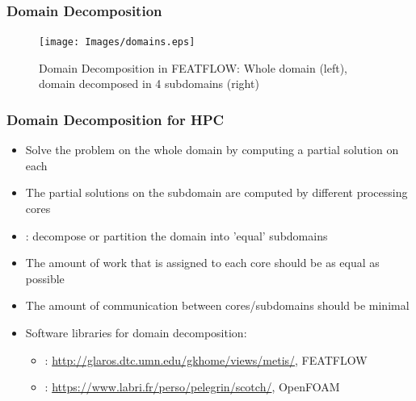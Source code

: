 \begin{frame}
\frametitle{Domain Decomposition}
\begin{figure}[h!]
\centering
\texttt{[image: Images/domains.eps]}
\caption{Domain Decomposition in FEATFLOW: Whole domain (left), domain decomposed in 4 subdomains (right)}
\label{fig:domains}
\end{figure}
\end{frame}

\begin{frame}
\frametitle{Domain Decomposition for HPC}
\begin{itemize}
\item Solve the problem on the whole domain by computing a partial solution on each 
\item The partial solutions on the subdomain are computed by different processing cores
\item {}: decompose or partition the domain into 'equal' subdomains
\item The amount of work that is assigned to each core should be as equal as possible
\item The amount of communication between cores/subdomains should be minimal
\item Software libraries for domain decomposition: 
\begin{itemize}
\item {}: \url{http://glaros.dtc.umn.edu/gkhome/views/metis/}, FEATFLOW
\item {}: \url{https://www.labri.fr/perso/pelegrin/scotch/}, OpenFOAM
\end{itemize}
\end{itemize}
\end{frame}

